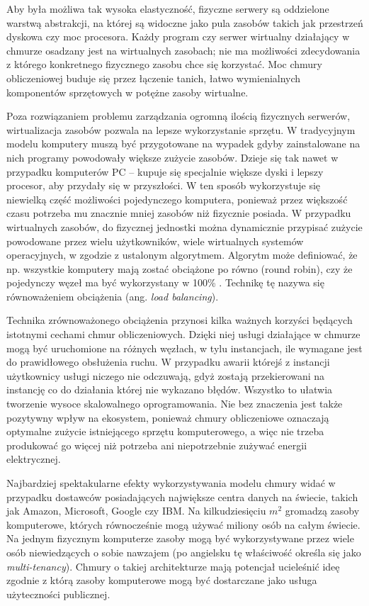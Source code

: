 \documentclass[12pt,a4paper,twoside,titlepage,openright]{book}
\begin{document}
Aby była możliwa tak wysoka elastyczność, fizyczne serwery są oddzielone warstwą abstrakcji, na której są widoczne jako pula zasobów takich jak przestrzeń dyskowa czy moc procesora. Każdy program czy serwer wirtualny działający w chmurze osadzany jest na wirtualnych zasobach; nie ma możliwości zdecydowania z którego konkretnego fizycznego zasobu chce się korzystać. Moc chmury obliczeniowej buduje się przez łączenie tanich, łatwo wymienialnych komponentów sprzętowych w potężne zasoby wirtualne. \cite{ccCambridge}

Poza rozwiązaniem problemu zarządzania ogromną ilością fizycznych serwerów, wirtualizacja zasobów pozwala na lepsze wykorzystanie sprzętu. W tradycyjnym modelu komputery muszą być przygotowane na wypadek gdyby zainstalowane na nich programy powodowały większe zużycie zasobów. Dzieje się tak nawet w przypadku komputerów PC -- kupuje się specjalnie większe dyski i lepszy procesor, aby przydały się w przyszłości. W ten sposób wykorzystuje się niewielką część możliwości pojedynczego komputera, ponieważ przez większość czasu potrzeba mu znacznie mniej zasobów niż fizycznie posiada. W przypadku wirtualnych zasobów, do fizycznej jednostki można dynamicznie przypisać zużycie powodowane przez wielu użytkowników, wiele wirtualnych systemów operacyjnych, w zgodzie z ustalonym algorytmem. Algorytm może definiować, że np. wszystkie komputery mają zostać obciążone po równo (round robin), czy że pojedynczy węzeł ma być wykorzystany w 100\% \cite{cloudFoundry}. Technikę tę nazywa się równoważeniem obciążenia (ang. \textit{load balancing}).

Technika zrównoważonego obciążenia przynosi kilka ważnych korzyści będących istotnymi cechami chmur obliczeniowych. Dzięki niej usługi działające w chmurze mogą być uruchomione na różnych węzłach, w tylu instancjach, ile wymagane jest do prawidłowego obsłużenia ruchu. W przypadku awarii którejś z instancji użytkownicy usługi niczego nie odczuwają, gdyż zostają przekierowani na instancję co do działania której nie wykazano błędów. Wszystko to ułatwia tworzenie wysoce skalowalnego oprogramowania. Nie bez znaczenia jest także pozytywny wpływ na ekosystem, ponieważ chmury obliczeniowe oznaczają optymalne zużycie istniejącego sprzętu komputerowego, a więc nie trzeba produkować go więcej niż potrzeba ani niepotrzebnie zużywać energii elektrycznej.

Najbardziej spektakularne efekty wykorzystywania modelu chmury widać w przypadku dostawców posiadających największe centra danych na świecie, takich jak Amazon, Microsoft, Google czy IBM. Na kilkudziesięciu $m^{2}$ gromadzą zasoby komputerowe, których równocześnie mogą używać miliony osób na całym świecie. Na jednym fizycznym komputerze zasoby mogą być wykorzystywane przez wiele osób niewiedzących o sobie nawzajem (po angielsku tę właściwość określa się jako \textit{multi-tenancy}). Chmury o takiej architekturze mają potencjał ucieleśnić ideę zgodnie z którą zasoby komputerowe mogą być dostarczane jako usługa użyteczności publicznej.
\end{document}
